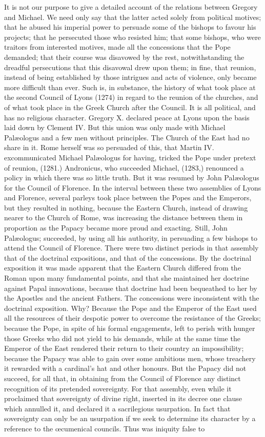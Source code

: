It is not our purpose to give a detailed account of the relations between Gregory and Michael. We need only say that the latter acted solely from political motives; that he abused his imperial power to persuade some of the bishops to favour his projects; that he persecuted those who resisted him; that some bishops, who were traitors from interested motives, made all the concessions that the Pope demanded; that their course was disavowed by the rest, notwithstanding the dreadful persecutions that this disavowal drew upon them; in fine, that reunion, instead of being established by those intrigues and acts of violence, only became more difficult than ever. Such is, in substance, the history of what took place at the second Council of Lyons (1274) in regard to the reunion of the churches, and of what took place in the Greek Church after the Council. It is all political, and has no religious character. Gregory X. declared peace at Lyons upon the basis laid down by Clement IV. But this union was only made with Michael Palæologus and a few men without principles. The Church of the East had no share in it. Rome herself was so persuaded of this, that Martin IV. excommunicated Michael Palæologus for having, tricked the Pope under pretext of reunion, (1281.) Andronicus, who succeeded Michael, (1283,) renounced a policy in which there was so little truth. But it was resumed by John Palæologus for the Council of Florence. In the interval between these two assemblies of Lyons and Florence, several parleys took place between the Popes and the Emperors, but they resulted in nothing, because the Eastern Church, instead of drawing nearer to the Church of Rome, was increasing the distance between them in proportion as the Papacy became more proud and exacting. Still, John Palæologus; succeeded, by using all his authority, in persuading a few bishops to attend the Council of Florence. There were two distinct periods in that assembly that of the doctrinal expositions, and that of the concessions. By the doctrinal exposition it was made apparent that the Eastern Church differed from the Roman upon many fundamental points, and that she maintained her doctrine against Papal innovations, because that doctrine had been bequeathed to her by the Apostles and the ancient Fathers. The concessions were inconsistent with the doctrinal exposition. Why? Because the Pope and the Emperor of the East used all the resources of their despotic power to overcome the resistance of the Greeks; because the Pope, in spite of his formal engagements, left to perish with hunger those Greeks who did not yield to his demands, while at the same time the Emperor of the East rendered their return to their country an impossibility; because the Papacy was able to gain over some ambitious men, whose treachery it rewarded with a cardinal's hat and other honours. But the Papacy did not succeed, for all that, in obtaining from the Council of Florence any distinct recognition of its pretended sovereignty. For that assembly, even while it proclaimed that sovereignty of divine right, inserted in its decree one clause which annulled it, and declared it a sacrilegious usurpation. In fact that sovereignty can only be an usurpation if we seek to determine its character by a reference to the œcumenical councils. Thus was iniquity false to 